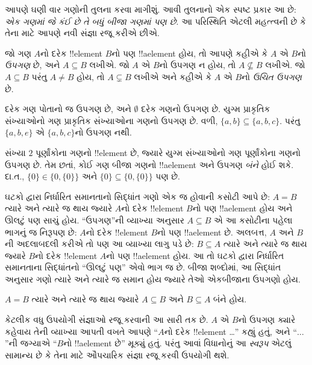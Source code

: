 \documentclass[../../../include/open-logic-section]{subfiles}
\begin{document}

\begin{explain}
આપણે ઘણી વાર ગણોની તુલના કરવા માગીશું. આવી તુલનાનો એક સ્પષ્ટ પ્રકાર આ છે:
\emph{એક ગણમાં જે કંઈ છે તે બધું બીજા ગણમાં પણ છે}.
આ પરિસ્થિતિ એટલી મહત્ત્વની છે કે તેના માટે આપણે નવી સંજ્ઞા રજૂ કરીએ છીએ.
\end{explain}

\begin{defn}[ઉપગણ]
જો ગણ $A$નો દરેક !!{element} $B$નો પણ !!a{element} હોય, તો આપણે કહીએ
કે $A$ એ $B$નો \emph{ઉપગણ} છે, અને $A \subseteq B$ લખીએ.
જો $A$ એ $B$નો ઉપગણ ન હોય, તો $A \not\subseteq B$ લખીએ.
જો $A \subseteq B$ પરંતુ $A \neq B$ હોય, તો $A \subsetneq B$ લખીએ
અને કહીએ કે $A$ એ $B$નો \emph{ઉચિત ઉપગણ} છે.
\end{defn}

\begin{ex}
દરેક ગણ પોતાનો જ ઉપગણ છે, અને $\emptyset$ દરેક ગણનો ઉપગણ છે.
યુગ્મ પ્રાકૃતિક સંખ્યાઓનો ગણ પ્રાકૃતિક સંખ્યાઓના ગણનો ઉપગણ છે.
વળી, $\{ a, b \} \subseteq \{ a, b, c \}$.
પરંતુ $\{ a, b, e \}$ એ $\{ a, b, c \}$નો ઉપગણ નથી.
\end{ex}

\begin{ex}
સંખ્યા $2$ પૂર્ણાંકોના ગણનો !!{element} છે, જ્યારે યુગ્મ સંખ્યાઓનો ગણ
પૂર્ણાંકોના ગણનો ઉપગણ છે. તેમ છતાં, કોઈ ગણ બીજા ગણનો !!a{element}
અને ઉપગણ \emph{બંને} હોઈ શકે. દા.ત.,
$\{0\} \in \{0, \{0\}\}$ અને $\{0\} \subseteq \{0, \{0\}\}$ પણ છે.
\end{ex}

ઘટકો દ્વારા નિર્ધારિત સમાનતાનો સિદ્ધાંત ગણો એક જ હોવાની કસોટી આપે છે:
$A = B$ ત્યારે અને ત્યારે જ થાય જ્યારે $A$નો દરેક !!{element}
$B$નો પણ !!a{element} હોય અને ઊલટું પણ સાચું હોય.
“ઉપગણ”ની વ્યાખ્યા અનુસાર $A \subseteq B$ એ આ કસોટીના પહેલા ભાગનું જ
નિરૂપણ છે: $A$નો દરેક !!{element} $B$નો પણ !!a{element} છે.
અલબત્ત, $A$ અને $B$ની અદલાબદલી કરીએ તો પણ આ વ્યાખ્યા લાગુ પડે છે:
$B \subseteq A$ ત્યારે અને ત્યારે જ થાય જ્યારે $B$નો દરેક !!{element}
$A$નો પણ !!a{element} હોય. આ તો ઘટકો દ્વારા નિર્ધારિત સમાનતાના
સિદ્ધાંતનો “ઊલટું પણ” એવો ભાગ જ છે.
બીજા શબ્દોમાં, આ સિદ્ધાંત અનુસાર ગણો ત્યારે અને ત્યારે જ સમાન હોય
જ્યારે તેઓ એકબીજાના ઉપગણો હોય.

\begin{prop}
$A = B$ ત્યારે અને ત્યારે જ થાય જ્યારે $A \subseteq B$ અને $B \subseteq A$ બંને હોય.
\end{prop}

કેટલીક વધુ ઉપયોગી સંજ્ઞાઓ રજૂ કરવાની આ સારી તક છે.
$A$ એ $B$નો ઉપગણ ક્યારે કહેવાય તેની વ્યાખ્યા આપતી વખતે આપણે
“$A$નો દરેક !!{element} \dots” કહ્યું હતું, અને “$\dots$”ની જગ્યાએ
“$B$નો !!a{element} છે” મૂક્યું હતું.
પરંતુ આવાં વિધાનોનું આ \emph{સ્વરૂપ} એટલું સામાન્ય છે કે તેના માટે
ઔપચારિક સંજ્ઞા રજૂ કરવી ઉપયોગી થશે.
\end{document}
